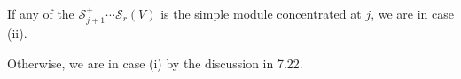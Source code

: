 If any of the $\mathcal{S}_{j+1}^+\cdots \mathcal{S}_r(V)$ is the simple module
concentrated at $j$, we are in case (ii).

Otherwise, we are in case (i) by the discussion in 7.22.

